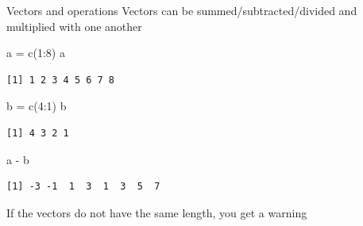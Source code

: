 \documentclass[
  ignorenonframetext,
]{beamer}
\newenvironment{Shaded}{\begin{snugshade}}{\end{snugshade}}
\newcommand{\DecValTok}[1]{\textcolor[rgb]{0.69,0.50,0.00}{#1}}
\newcommand{\FunctionTok}[1]{\textcolor[rgb]{0.39,0.29,0.61}{#1}}
\newcommand{\NormalTok}[1]{\textcolor[rgb]{0.12,0.11,0.11}{#1}}
\newcommand{\OtherTok}[1]{\textcolor[rgb]{0.00,0.43,0.16}{#1}}
\newcommand{\SpecialCharTok}[1]{\textcolor[rgb]{0.24,0.68,0.91}{#1}}
\begin{document}
\begin{frame}[fragile]{Vectors and operations}
\protect\hypertarget{vectors-and-operations}{}
Vectors can be summed/subtracted/divided and multiplied with one another

\begin{Shaded}
\begin{Highlighting}[]
\NormalTok{a }\OtherTok{=} \FunctionTok{c}\NormalTok{(}\DecValTok{1}\SpecialCharTok{:}\DecValTok{8}\NormalTok{)}
\NormalTok{a}
\end{Highlighting}
\end{Shaded}

\begin{verbatim}
[1] 1 2 3 4 5 6 7 8
\end{verbatim}

\begin{Shaded}
\begin{Highlighting}[]
\NormalTok{b }\OtherTok{=} \FunctionTok{c}\NormalTok{(}\DecValTok{4}\SpecialCharTok{:}\DecValTok{1}\NormalTok{)}
\NormalTok{b }
\end{Highlighting}
\end{Shaded}

\begin{verbatim}
[1] 4 3 2 1
\end{verbatim}

\begin{Shaded}
\begin{Highlighting}[]
\NormalTok{a }\SpecialCharTok{{-}}\NormalTok{ b}
\end{Highlighting}
\end{Shaded}

\begin{verbatim}
[1] -3 -1  1  3  1  3  5  7
\end{verbatim}

If the vectors do not have the same length, you get a warning
\end{frame}
\end{document}

